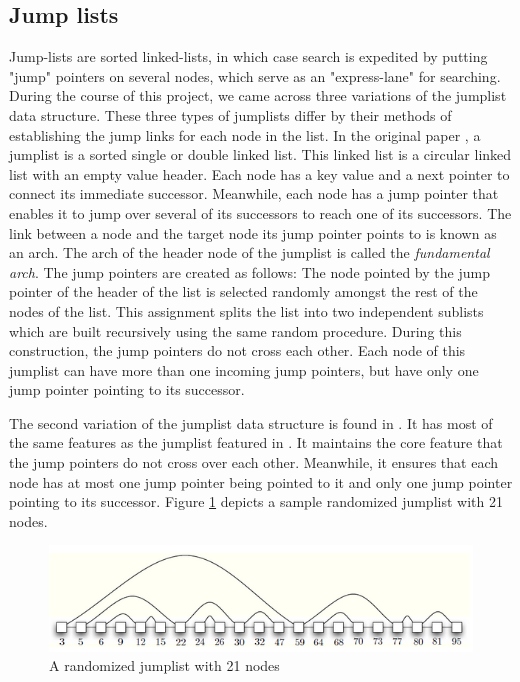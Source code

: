 \documentclass[oribibl]{llncs}
\begin{document}
\subsection{Jump lists}

Jump-lists \cite{jump_list} are sorted linked-lists, in which case search is expedited by putting "jump" pointers on several nodes, which serve as an "express-lane" for searching. During the course of this project, we came across three variations of the jumplist data structure. These three types of jumplists differ by their methods of establishing the jump links for each node in the list. In the original paper \cite{jump_list}, a jumplist is a sorted single or double linked list. This linked list is a circular linked list with an empty value header. Each node has a key value and a next pointer to connect its immediate successor. Meanwhile, each node has a jump pointer that enables it to jump over several of its successors to reach one of its successors. The link between a node and the target node its jump pointer points to is known as an arch. The arch of the header node of the jumplist is called the {\it fundamental arch}. The jump pointers are created as follows: The node pointed by the jump pointer of the header of the list is selected randomly amongst the rest of the nodes of the list. This assignment splits the list into two independent sublists which are built recursively using the same random procedure. During this construction, the jump pointers do not cross each other. Each node of this jumplist can have more than one incoming jump pointers, but have only one jump pointer pointing to its successor.

The second variation of the jumplist data structure is found in \cite{skip_lift}. It has most of the same features as the jumplist featured in \cite{jump_list}. It maintains the core feature that the jump pointers do not cross over each other. Meanwhile, it ensures that each node has at most one jump pointer being pointed to it and only one jump pointer pointing to its successor. Figure \ref{fig:jumplist} depicts a sample randomized jumplist with 21 nodes.


\begin{figure}[here]
\center
\includegraphics[width=15cm]{images/jumplist}
\caption{A randomized jumplist with 21 nodes}
\label{fig:jumplist}
\end{figure}
\end{document}
